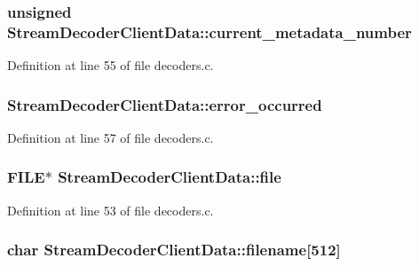 \subsubsection[{\texorpdfstring{current\+\_\+metadata\+\_\+number}{current_metadata_number}}]{\setlength{\rightskip}{0pt plus 5cm}unsigned Stream\+Decoder\+Client\+Data\+::current\+\_\+metadata\+\_\+number}\hypertarget{struct_stream_decoder_client_data_adfcec694a112d64c6bee5237c4f5fb7b}{}\label{struct_stream_decoder_client_data_adfcec694a112d64c6bee5237c4f5fb7b}


Definition at line 55 of file decoders.\+c.

\subsubsection[{\texorpdfstring{error\+\_\+occurred}{error_occurred}}]{ Stream\+Decoder\+Client\+Data\+::error\+\_\+occurred}\hypertarget{struct_stream_decoder_client_data_aec3d90fca3d1235cb53f3f2b70fb4dd5}{}\label{struct_stream_decoder_client_data_aec3d90fca3d1235cb53f3f2b70fb4dd5}


Definition at line 57 of file decoders.\+c.

\subsubsection[{\texorpdfstring{file}{file}}]{\setlength{\rightskip}{0pt plus 5cm}F\+I\+LE$\ast$ Stream\+Decoder\+Client\+Data\+::file}\hypertarget{struct_stream_decoder_client_data_a840124d1e6584161d0c9825e2aa19d29}{}\label{struct_stream_decoder_client_data_a840124d1e6584161d0c9825e2aa19d29}


Definition at line 53 of file decoders.\+c.

\subsubsection[{\texorpdfstring{filename}{filename}}]{\setlength{\rightskip}{0pt plus 5cm}char Stream\+Decoder\+Client\+Data\+::filename\mbox{[}512\mbox{]}}\hypertarget{struct_stream_decoder_client_data_a3d8a4027448583d4cf337c46a9b46680}{}\label{struct_stream_decoder_client_data_a3d8a4027448583d4cf337c46a9b46680}


